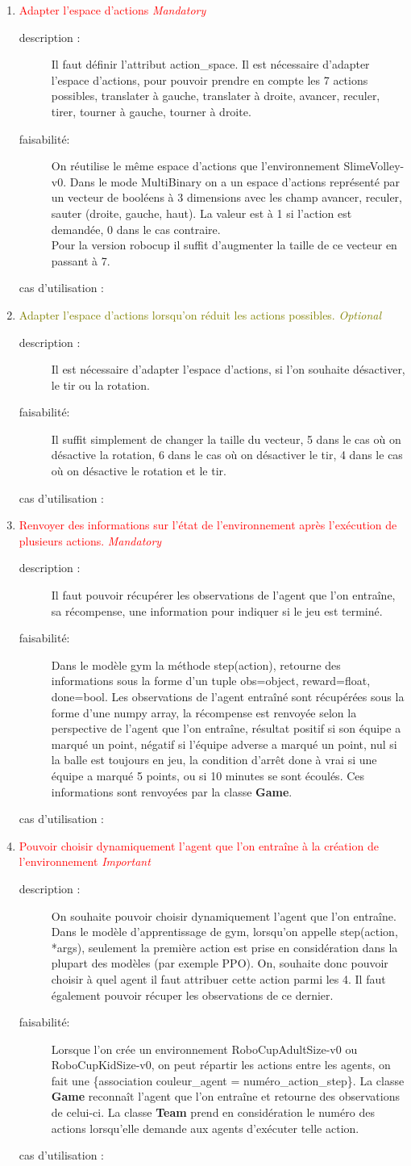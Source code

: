 \documentclass[11pt, a4paper]{article}
\newcommand{\besoinVItem}[4]{
	\item #1
	\begin{description}
		\item[description :]
		#2
		\item[faisabilité: ]
		#3
		\item[cas d'utilisation :]
		#4
	\end{description}
}
\begin{document}
\begin{enumerate}
\begin{enumerate}
			\besoinVItem{\textcolor{red}{Adapter l'espace d'actions \textit{Mandatory}}
			}
			{Il faut définir l'attribut action\_space. Il est nécessaire d'adapter l'espace d'actions, pour pouvoir prendre en compte les 7 actions possibles, translater à gauche, translater à droite, avancer, reculer, tirer, tourner à gauche, tourner à droite.
			}
			{On réutilise le même espace d'actions que l'environnement SlimeVolley-v0.
			Dans le mode MultiBinary on a un espace d'actions représenté par un vecteur de booléens à 3 dimensions avec les champ avancer, reculer, sauter (droite, gauche, haut). La valeur est à 1 si l'action est demandée, 0 dans le cas contraire. \\
			Pour la version robocup il suffit d'augmenter la taille de ce vecteur en passant à 7.
			}
			{}

			\besoinVItem{\textcolor{olive}{Adapter l'espace d'actions lorsqu'on réduit les actions possibles. \textit{Optional}}
			}
			{Il est nécessaire d'adapter l'espace d'actions, si l'on souhaite désactiver, le tir ou la rotation.
			}
			{Il suffit simplement de changer la taille du vecteur, 5 dans le cas où on désactive la rotation, 6 dans le cas où on désactiver le tir,
				4 dans le cas où on désactive le rotation et le tir.
			}
			{}

			\besoinVItem{\textcolor{red}{Renvoyer des informations sur l'état de l'environnement après l'exécution de plusieurs actions. \textit{Mandatory}}
			}
			{Il faut pouvoir récupérer les observations de l'agent que l'on entraîne, sa récompense, une information pour indiquer si le jeu est terminé.
			}
			{Dans le modèle gym la méthode step(action), retourne des informations sous la forme d'un tuple obs=object, reward=float, done=bool.
			Les observations de l'agent entraîné sont récupérées sous la forme d'une numpy array, la récompense est renvoyée selon la perspective de l'agent que l'on entraîne, résultat positif si son équipe a marqué un point, négatif si l'équipe adverse a marqué un point, nul si la balle est toujours en jeu, la condition d'arrêt done à vrai si une équipe a marqué 5 points, ou si 10 minutes se sont écoulés. Ces informations sont renvoyées par la classe \textbf{Game}.
			}
			{}

			\besoinVItem{\textcolor{red}{Pouvoir choisir dynamiquement l'agent que l'on entraîne à la création de l'environnement \textit{Important}}
			}
			{On souhaite pouvoir choisir dynamiquement l'agent que l'on entraîne. Dans le modèle d'apprentissage de gym, lorsqu'on appelle step(action, *args), seulement la première action est prise en considération dans la plupart des modèles (par exemple PPO). On, souhaite donc pouvoir choisir à quel agent il faut attribuer cette action parmi les 4. Il faut également pouvoir récuper les observations de ce dernier.
			}
			{Lorsque l'on crée un environnement RoboCupAdultSize-v0 ou RoboCupKidSize-v0, on peut répartir les actions entre les agents, on fait une \{association couleur\_agent = numéro\_action\_step\}. La classe \textbf{Game} reconnaît l'agent que l'on entraîne et retourne des observations de celui-ci. La classe \textbf{Team} prend en considération le numéro des actions lorsqu'elle demande aux agents d'exécuter telle action.
			}
			{}


\end{enumerate}
\end{enumerate}
\end{document}
